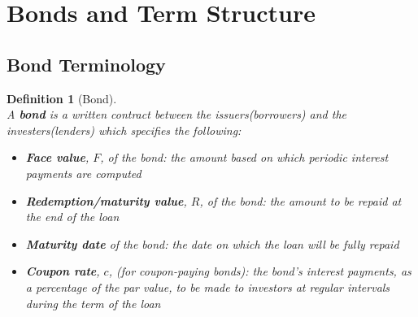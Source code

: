\documentclass[12pt]{article}
\newtheorem{definition}{Definition}[section]
\theoremstyle{definition}
\begin{document}
\section{Bonds and Term Structure}
\subsection{Bond Terminology}
\begin{definition}[Bond]
\hfill\\\normalfont
A \textbf{bond} is a written contract between the issuers(borrowers) and the investers(lenders) which specifies the following:
\begin{itemize}
  \item \textbf{Face value}, $F$, of the bond: the amount based on which periodic interest payments are computed
  \item \textbf{Redemption/maturity value}, $R$, of the bond: the amount to be repaid at the end of the loan
  \item \textbf{Maturity date} of the bond: the date on which the loan will be fully repaid
  \item \textbf{Coupon rate}, $c$, (for coupon-paying bonds): the bond's interest payments, as a percentage of the par value, to be made to investors at regular intervals during the term of the loan
\end{itemize}
\end{definition}
\end{document}
